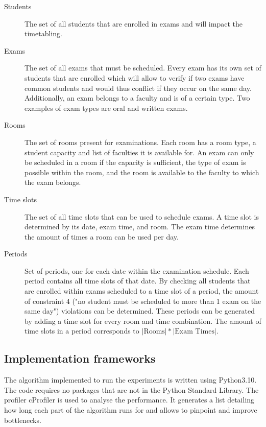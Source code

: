 \begin{description}
   \item [Students] The set of all students that are enrolled in exams and will impact the timetabling.
   \item[Exams] The set of all exams that must be scheduled. Every exam has its own set of students that are enrolled which will allow to verify if two exams have common students and would thus conflict if they occur on the same day. Additionally, an exam belongs to a faculty and is of a certain type. Two examples of exam types are oral and written exams.
   \item[Rooms] The set of rooms present for examinations. Each room has a room type, a student capacity and  list of faculties it is available for. An exam can only be scheduled in a room if the capacity is sufficient, the type of exam is possible within the room, and the room is available to the faculty to which the exam belongs.
    \item[Time slots] The set of all time slots that can be used to schedule exams. A time slot is determined by its date, exam time, and room. The exam time determines the amount of times a room can be used per day.
    \item[Periods] Set of periods, one for each date within the examination schedule. Each period contains all time slots of that date. By checking all students that are enrolled within exams scheduled to a time slot of a period, the amount of constraint 4 ("no student must be scheduled to more than 1 exam on the same day") violations can be determined. These periods can be generated by adding a time slot for every room and time combination. The amount of time slots in a period corresponds to $|\text{Rooms}| * |\text{Exam Times}|$.
\end{description}


\subsection{Implementation frameworks}

The algorithm implemented to run the experiments is written using Python3.10. The code requires no packages that are not in the Python Standard Library. The profiler cProfiler is used to analyse the performance. It generates a list detailing how long each part of the algorithm runs for and allows to pinpoint and improve bottlenecks.


